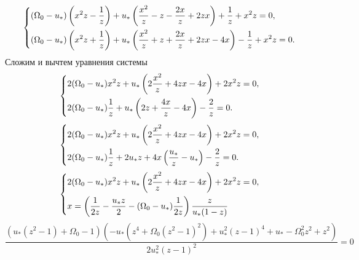 \documentclass[a4paper,14pt]{article}
\theoremstyle{plain} %
\theoremstyle{definition} %
\theoremstyle{remark} %
\begin{document}
{\begin{equation}\label{fullchanged1}
    \left\{ {\begin{aligned}
                 & (\Omega_0-u_*)\left( x^2z-\frac{1}{z}\right)+u_*\left(\frac{x^2}{z}-z-\frac{2x}{z}+2zx\right)+\frac{1}{z}+x^2z=0, \hfill    \\
                 & (\Omega_0-u_*)\left( x^2z+\frac{1}{z}\right)+u_*\left(\frac{x^2}{z}+z+\frac{2x}{z}+2zx-4x\right)-\frac{1}{z}+x^2z=0. \hfill \\
            \end{aligned}} \right.
\end{equation}
Сложим и вычтем уравнения системы
\begin{equation}\label{fullchanged2}
    \left\{ {\begin{aligned}
                 & 2(\Omega_0-u_*)x^2z+u_*\left(2\frac{x^2}{z}+4zx-4x\right)+2x^2z=0, \hfill    \\
                 & 2(\Omega_0-u_*)\frac{1}{z}+u_*\left(2z+\frac{4x}{z}-4x\right)-\frac{2}{z}=0. \hfill    \\
            \end{aligned}} \right.
\end{equation}
\begin{equation}\label{fullchanged2}
    \left\{ {\begin{aligned}
                 & 2(\Omega_0-u_*)x^2z+u_*\left(2\frac{x^2}{z}+4zx-4x\right)+2x^2z=0, \hfill    \\
                 & 2(\Omega_0-u_*)\frac{1}{z}+2u_*z+4x\left(\frac{u_*}{z}-u_*\right)-\frac{2}{z}=0. \hfill    \\
            \end{aligned}} \right.
\end{equation}
\begin{equation}\label{fullchanged2}
    \left\{ {\begin{aligned}
                 & 2(\Omega_0-u_*)x^2z+u_*\left(2\frac{x^2}{z}+4zx-4x\right)+2x^2z=0, \hfill    \\
                 & x=\left( \frac{1}{2z}-\frac{u_*z}{2}-(\Omega_0-u_*)\frac{1}{2z}\right)\frac{z}{u_*(1-z)} \hfill    \\
            \end{aligned}} \right.
\end{equation}
\[
    \frac{\left(u_* \left(z^2-1\right)+\Omega _0-1\right) \left(-u_* \left(z^4+\Omega _0 \left(z^2-1\right)^2\right)+u_*^2 (z-1)^4+u_*-\Omega _0^2 z^2+z^2\right)}{2 u_*^2 (z-1)^2}=0
\]
\begin{equation}\label{fullchanged2}

\end{equation}}
\end{document}
